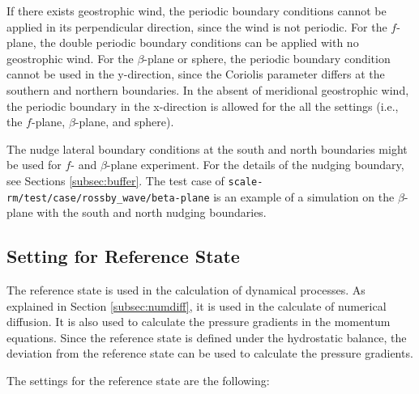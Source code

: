 If there exists geostrophic wind, the periodic boundary conditions cannot be applied in its perpendicular direction, since the wind is not periodic.
For the $f$-plane, the double periodic boundary conditions can be applied with no geostrophic wind.
For the $\beta$-plane or sphere, the periodic boundary condition cannot be used in the y-direction, since the Coriolis parameter differs at the southern and northern boundaries.
In the absent of meridional geostrophic wind, the periodic boundary in the x-direction is allowed for the all the settings (i.e., the $f$-plane, $\beta$-plane, and sphere).


The nudge lateral boundary conditions at the south and north boundaries might be used for $f$- and $\beta$-plane experiment.
For the details of the nudging boundary, see Sections \ref{subsec:buffer}.
The test case of \verb|scale-rm/test/case/rossby_wave/beta-plane| is an example of a simulation on the $\beta$-plane with the south and north nudging boundaries.




\subsection{Setting for Reference State} \label{subsec:refstat}

The reference state is used in the calculation of dynamical processes.
As explained in Section \ref{subsec:numdiff}, it is used in the calculate of numerical diffusion.
It is also used to calculate the pressure gradients in the momentum equations.
Since the reference state is defined under the hydrostatic balance, the deviation from the reference state can be used to calculate the pressure gradients.



The settings for the reference state are the following:

